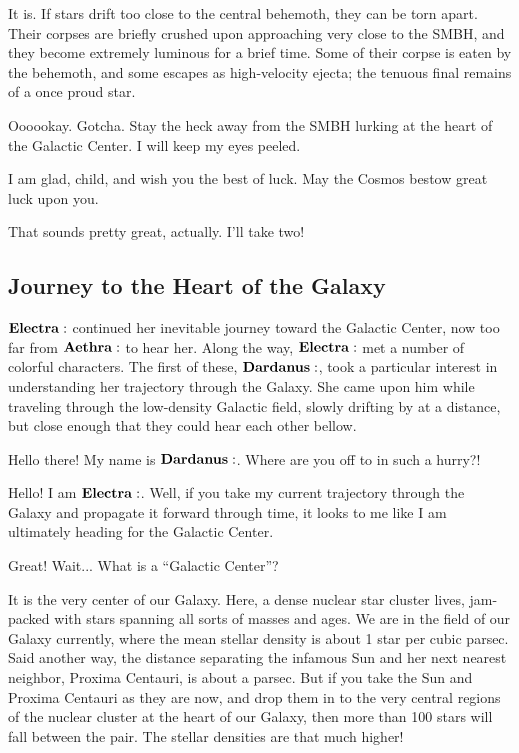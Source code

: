 \Aethra It is.  If stars drift too close to the central behemoth, they can be torn apart.  Their corpses are briefly crushed upon approaching very close to the SMBH, and they become extremely luminous for a brief time.  Some of their corpse is eaten by the behemoth, and some escapes as high-velocity ejecta; the tenuous final remains of a once proud star.

\Elctra Oooookay.  Gotcha.  Stay the heck away from the SMBH lurking at the heart of the Galactic Center.  I will keep my eyes peeled.

\Aethra I am glad, child, and wish you the best of luck.  May the Cosmos bestow great luck upon you.

\Electra That sounds pretty great, actually.  I'll take two!

\subsection{Journey to the Heart of the Galaxy} \label{journey}

$\Electra$ continued her inevitable journey toward the Galactic Center, now too far from $\Aethra$ to hear her.  Along the way, $\Electra$ met a number of colorful characters.  The first of these, $\Dardanus$, took a particular interest in understanding her trajectory through the Galaxy.  She came upon him while traveling through the low-density Galactic field, slowly drifting by at a distance, but close enough that they could hear each other bellow.

\Dardanus Hello there!  My name is $\Dardanus$.  Where are you off to in such a hurry?!

\Electra  Hello!  I am $\Electra$.  Well, if you take my current trajectory through the Galaxy and propagate it forward through time, it looks to me like I am ultimately heading for the Galactic Center.

\Dardanus  Great!  Wait... What is a ``Galactic Center''?

\Electra  It is the very center of our Galaxy.  Here, a dense nuclear star cluster lives, jam-packed with stars spanning all sorts of masses and ages.  We are in the field of our Galaxy currently, where the mean stellar density is about 1 star per cubic parsec.  Said another way, the distance separating the infamous Sun and her next nearest neighbor, Proxima Centauri, is about a parsec.  But if you take the Sun and Proxima Centauri as they are now, and drop them in to the very central regions of the nuclear cluster at the heart of our Galaxy, then more than 100 stars will fall between the pair.  The stellar densities are that much higher!

